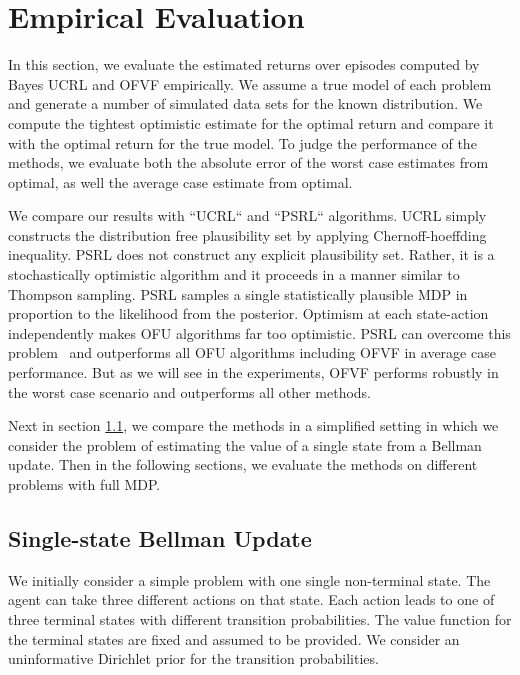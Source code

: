 \documentclass{article}
\theoremstyle{plain}
\theoremstyle{definition}
\begin{document}
\section{Empirical Evaluation} \label{sec:experiments}

In this section, we evaluate the estimated returns over episodes computed by Bayes UCRL and OFVF empirically. We assume a true model of each problem and generate a number of simulated data sets for the known distribution. We compute the tightest optimistic estimate for the optimal return and compare it with the optimal return for the true model. To judge the performance of the methods, we evaluate both the absolute error of the worst case estimates from optimal, as well the average case estimate from optimal.

We compare our results with ``UCRL`` and ``PSRL`` algorithms. UCRL simply constructs the distribution free plausibility set by applying Chernoff-hoeffding inequality. PSRL does not construct any explicit plausibility set. Rather, it is a stochastically optimistic algorithm and it proceeds in a manner similar to Thompson sampling. PSRL samples a single statistically plausible MDP in proportion to the likelihood from the posterior. Optimism at each state-action independently makes OFU algorithms far too optimistic. PSRL can overcome this problem~\cite{Osband2016} and outperforms all OFU algorithms including OFVF in average case performance. But as we will see in the experiments, OFVF performs robustly in the worst case scenario and outperforms all other methods.

Next in section \cref{ssection:single_state}, we compare the methods in a simplified setting in which we consider the problem of estimating the value of a single state from a Bellman update. Then in the following sections, we evaluate the methods on different problems with full MDP.

\subsection{Single-state Bellman Update} \label{ssection:single_state}
We initially consider a simple problem with one single non-terminal state. The agent can take three different actions on that state. Each action leads to one of three terminal states with different transition probabilities. The value function for the terminal states are fixed and assumed to be provided. We consider an uninformative Dirichlet prior for the transition probabilities. 
\end{document}
